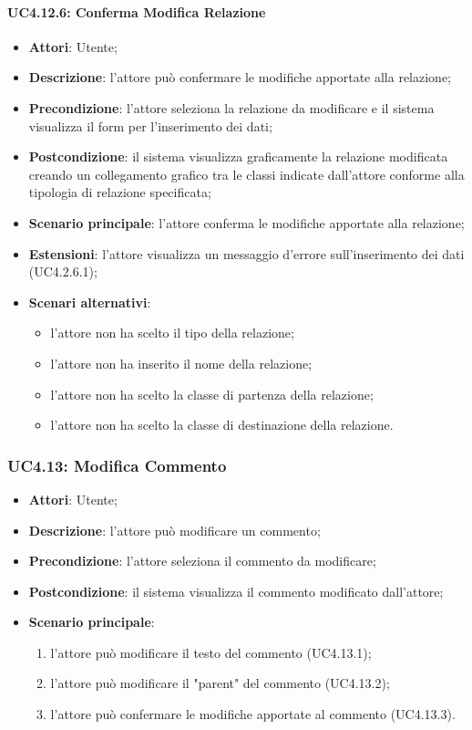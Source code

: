 \paragraph{UC4.12.6: Conferma Modifica Relazione}
\label{UC4.12.6}
\begin{itemize}
\item \textbf{Attori}: Utente;
\item \textbf{Descrizione}: l'attore può confermare le modifiche apportate alla relazione;	
\item \textbf{Precondizione}: l'attore seleziona la relazione da modificare e il sistema visualizza il form per l'inserimento dei dati;	
\item \textbf{Postcondizione}:  il sistema visualizza graficamente la relazione modificata creando un collegamento grafico tra le classi indicate dall'attore conforme alla tipologia di relazione specificata;
\item \textbf{Scenario principale}:
l'attore conferma le modifiche apportate alla relazione;	
\item \textbf{Estensioni}:
l'attore visualizza un messaggio d'errore sull'inserimento dei dati (UC4.2.6.1);
\item \textbf{Scenari alternativi}:
\begin{itemize}
	\item l'attore non ha scelto il tipo della relazione;
	\item l'attore non ha inserito il nome della relazione;
	\item l'attore non ha scelto la classe di partenza della relazione;
	\item l'attore non ha scelto la classe di destinazione della relazione.
\end{itemize}
\end{itemize}

\subsubsection{UC4.13: Modifica Commento}
\label{UC4.13}
\begin{itemize}
\item \textbf{Attori}: Utente;
\item \textbf{Descrizione}: l'attore può modificare un commento;	
\item \textbf{Precondizione}: l'attore seleziona il commento da modificare;	
\item \textbf{Postcondizione}: il sistema visualizza il commento modificato dall'attore;	
\item \textbf{Scenario principale}:
\begin{enumerate}
\item l'attore può modificare il testo del commento (UC4.13.1);
\item l'attore può modificare il "parent" del commento (UC4.13.2);
\item l'attore può confermare le modifiche apportate al commento (UC4.13.3).
\end{enumerate}
\end{itemize}


